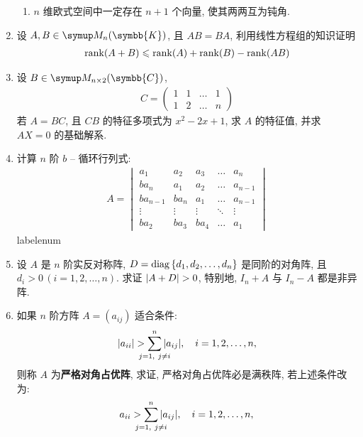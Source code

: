 \documentclass{ctexart}
\makeatletter
\let\le\leqslant
\def\asteriskitem{*}
\def\sitem{%
  \expandafter\let\expandafter\originallabel\csname labelenum\romannumeral\@enumdepth\endcsname
  \expandafter\def\csname labelenum\romannumeral\@enumdepth\expandafter\endcsname\expandafter{%
    \expandafter\bfseries\expandafter\color{red}\expandafter{\expandafter\asteriskitem\expandafter\originallabel}}%
  \item
  \expandafter\let\csname labelenum\romannumeral\@enumdepth\endcsname\originallabel
}
\newcommand{\K}{\ensuremath{\symbb{K}}}
\newcommand{\C}{\ensuremath{\symbb{C}}}
\DeclareMathOperator{\diag}{diag}
\makeatother
\begin{document}
\begin{enumerate}[series=exer]
\begin{enumerate}
        \item $ n $ 维欧式空间中一定存在 $ n + 1 $ 个向量, 使其两两互为钝角.
    \end{enumerate}
    \item 设 $ A, B \in \MM[\K] $, 且 $ AB = BA $, 利用线性方程组的知识证明
    \begin{align*}
        \rank(A + B) \le \rank(A) + \rank(B) - \rank(AB)
    \end{align*}
    \item 设 $ B \in \MM[\C][n \times 2] $, 
    \begin{align*}
        C = \begin{pmatrix}
            1 & 1 & \dots & 1\\
            1 & 2 & \dots & n
        \end{pmatrix}
    \end{align*}
    若 $ A = BC $, 且 $ CB $ 的特征多项式为 $ x^{2} - 2x + 1 $, 求 $ A $ 的特征值, 并求 $ AX = 0 $ 的基础解系. 
    \item  计算 $ n $ 阶 $ b $ -- 循环行列式:
    \begin{align*}
        A = \begin{vmatrix}
            a_{1}   & a_{2} & a_{3} & \ldots    & a_{n} \\
            ba_{n}  & a_{1} & a_{2} & \ldots    & a_{n-1} \\
            ba_{n-1}    & ba_{n}    & a_{1} & \ldots & a_{n-1} \\
            \vdots  & \vdots & \vdots & \ddots & \vdots \\
            ba_{2} & ba_{3} & ba_{4} & \ldots & a_{1}
        \end{vmatrix}
    \end{align*}
    \sitem\label{item:反称加对角} 设 $ A $ 是 $ n $ 阶实反对称阵, $ D = \diag\qty{d_{1}, d_{2}, \dots, d_{n}} $ 是同阶的对角阵, 且 $ d_{i} > 0\,(i = 1, 2, \dots, n) $. 求证 $ \abs{A + D} > 0 $, 特别地, $ I_{n} + A $ 与 $ I_{n} - A $ 都是非异阵. 
    \item 如果 $ n $ 阶方阵 $ A = (a_{ij}) $ 适合条件:
    \begin{align*}
        \abs{a_{ii}} > \sum_{\mathclap{j = 1,\ j \ne i}}^{n} \abs{a_{ij}}, \quad i = 1, 2, \dots, n,
    \end{align*}
    则称 $ A $ 为\textbf{严格对角占优阵}, 求证, 严格对角占优阵必是满秩阵, 若上述条件改为:
    \begin{align*}
        a_{ii} > \sum_{\mathclap{j = 1,\ j \ne i}}^{n} \abs{a_{ij}}, \quad i = 1, 2, \dots, n,

\end{align*}
\end{enumerate}
\end{document}

